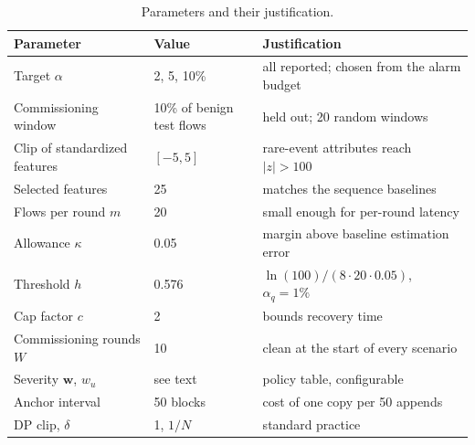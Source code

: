\documentclass[journal]{IEEEtran}
\begin{document}
\begin{table}[t]
\centering
\caption{Parameters and their justification.}
\label{tab:params}
\setlength{\tabcolsep}{3pt}
\footnotesize
\begin{tabular}{@{}p{2.3cm}p{1.6cm}p{3.7cm}@{}}
\toprule
Parameter & Value & Justification \\
\midrule
Target $\alpha$ & 2, 5, 10\% & all reported; chosen from the alarm budget \\
Commissioning window & 10\% of benign test flows & held out; 20 random windows \\
Clip of standardized features & $[-5,5]$ & rare-event attributes reach $|z|>100$ \\
Selected features & 25 & matches the sequence baselines \\
Flows per round $m$ & 20 & small enough for per-round latency \\
Allowance $\kappa$ & 0.05 & margin above baseline estimation error \\
Threshold $h$ & 0.576 & $\ln(100)/(8\cdot20\cdot0.05)$, $\alpha_q=1\%$ \\
Cap factor $c$ & 2 & bounds recovery time \\
Commissioning rounds $W$ & 10 & clean at the start of every scenario \\
Severity $\mathbf{w}$, $w_u$ & see text & policy table, configurable \\
Anchor interval & 50 blocks & cost of one copy per 50 appends \\
DP clip, $\delta$ & 1, $1/N$ & standard practice \\
\bottomrule
\end{tabular}
\end{table}
\end{document}
